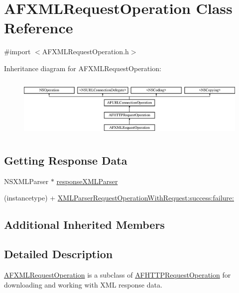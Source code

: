 \hypertarget{interface_a_f_x_m_l_request_operation}{\section{A\-F\-X\-M\-L\-Request\-Operation Class Reference}
\label{interface_a_f_x_m_l_request_operation}
}


{\ttfamily \#import $<$A\-F\-X\-M\-L\-Request\-Operation.\-h$>$}

Inheritance diagram for A\-F\-X\-M\-L\-Request\-Operation\-:\begin{figure}[H]
\begin{center}
\leavevmode
\includegraphics[height=2.978724cm]{interface_a_f_x_m_l_request_operation}
\end{center}
\end{figure}
\subsection*{Getting Response Data}
\label{_amgrp340ce32ae113767db7eae51a3f1bb98f}%


 

 \begin{DoxyCompactItemize}
\item 
N\-S\-X\-M\-L\-Parser $\ast$ \hyperlink{interface_a_f_x_m_l_request_operation_ac30bf93cf79e7859bd62e480f320af55}{response\-X\-M\-L\-Parser}
\item 
(instancetype) + \hyperlink{interface_a_f_x_m_l_request_operation_ae0e16d81ab1dc97ebb489132f9708387}{X\-M\-L\-Parser\-Request\-Operation\-With\-Request\-:success\-:failure\-:}
\end{DoxyCompactItemize}
\subsection*{Additional Inherited Members}


\subsection{Detailed Description}
{\ttfamily \hyperlink{interface_a_f_x_m_l_request_operation}{A\-F\-X\-M\-L\-Request\-Operation}} is a subclass of {\ttfamily \hyperlink{interface_a_f_h_t_t_p_request_operation}{A\-F\-H\-T\-T\-P\-Request\-Operation}} for downloading and working with X\-M\-L response data.

